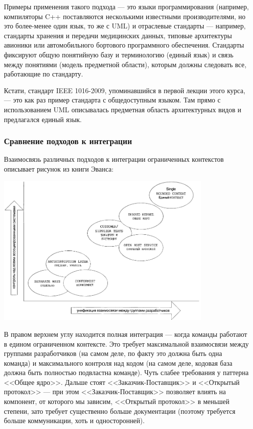 \documentclass[a5paper]{article}
\begin{document}
Примеры применения такого подхода --- это языки программирования (например, компиляторы C++ поставляются несколькими известными производителями, но это более-менее один язык, то же с UML) и отраслевые стандарты --- например, стандарты хранения и передачи медицинских данных, типовые архитектуры авионики или автомобильного бортового программного обеспечения. Стандарты фиксируют общую понятийную базу и терминологию (единый язык) и связь между понятиями (модель предметной области), которым должны следовать все, работающие по стандарту. 

Кстати, стандарт IEEE 1016-2009, упоминавшийся в первой лекции этого курса, --- это как раз пример стандарта с общедоступным языком. Там прямо с использованием UML описывалась предметная область архитектурных видов и предлагался единый язык.

\subsubsection{Сравнение подходов к интеграции}

Взаимосвязь различных  подходов к интеграции ограниченных контекстов описывает рисунок из книги Эванса: 

\begin{center}
    \includegraphics[width=0.8\textwidth]{integrationPatterns.png}
\end{center}

В правом верхнем углу находится полная интеграция --- когда команды работают в едином ограниченном контексте. Это требует максимальной взаимосвязи между группами разработчиков (на самом деле, по факту это должна быть одна команда) и максимального контроля над кодом (на самом деле, кодовая база должна быть полностью подвластна команде). Чуть слабее требования у паттерна <<Общее ядро>>. Дальше стоят <<Заказчик-Поставщик>> и <<Открытый протокол>> --- при этом <<Заказчик-Поставщик>> позволяет влиять на компонент, от которого мы зависим, <<Открытый протокол>> в меньшей степени, зато требует существенно больше документации (поэтому требуется больше коммуникации, хоть и односторонней).
\end{document}
